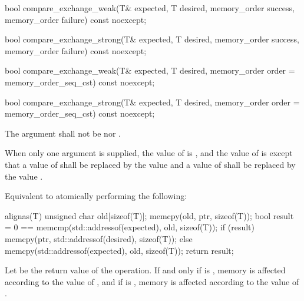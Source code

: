 \begin{itemdecl}
bool compare_exchange_weak(T& expected, T desired,
                           memory_order success, memory_order failure) const noexcept;

bool compare_exchange_strong(T& expected, T desired,
                             memory_order success, memory_order failure) const noexcept;

bool compare_exchange_weak(T& expected, T desired,
                           memory_order order = memory_order_seq_cst) const noexcept;

bool compare_exchange_strong(T& expected, T desired,
                             memory_order order = memory_order_seq_cst) const noexcept;
\end{itemdecl}

\begin{itemdescr}
\pnum
\removed{\requires}\added{\expects} The  argument shall not be
 nor .

\pnum
\effects
\begin{addedblock}
When only one  argument is supplied,
the value of  is , and
the value of  is 
except that a value of  shall be replaced by
the value  and
a value of  shall be replaced by
the value .
\end{addedblock}

\begin{addedblock}
Equivalent to atomically performing the following:
\begin{codeblock}
  alignas(T) unsigned char old[sizeof(T)];
  memcpy(old, ptr, sizeof(T));
  bool result = 0 == memcmp(std::addressof(expected), old, sizeof(T));
  if (result) memcpy(ptr, std::addressof(desired), sizeof(T));
  else memcpy(std::addressof(expected), old, sizeof(T));
  return result;
\end{codeblock}

\pnum
Let  be the return value of the operation.
If and only if  is ,
memory is affected according to the value of , and
if  is ,
memory is affected according to the value of .
\end{addedblock}


\end{itemdescr}
